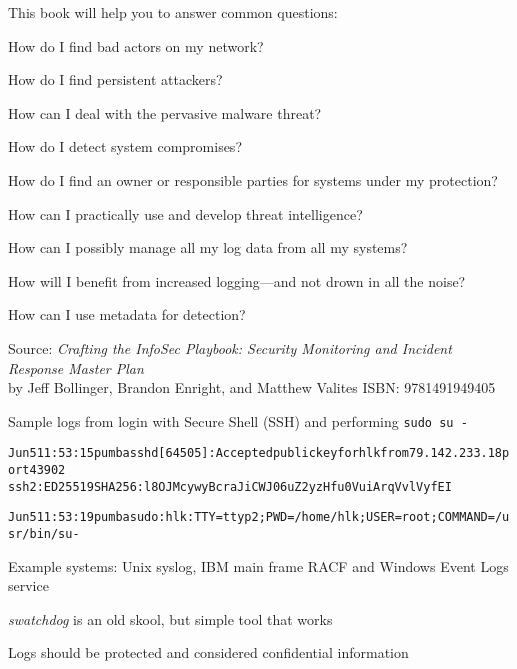 \documentclass[Screen16to9,17pt]{foils}
\begin{document}


This book will help you to answer common questions:
\begin{list2}
\item How do I find bad actors on my network?
\item How do I find persistent attackers?
\item How can I deal with the pervasive malware threat?
\item How do I detect system compromises?
\item How do I find an owner or responsible parties for systems under my protection?
\item How can I practically use and develop threat intelligence?
\item How can I possibly manage all my log data from all my systems?
\item How will I benefit from increased logging—and not drown in all the noise?
\item How can I use metadata for detection?
\end{list2}
Source: \emph{Crafting the InfoSec Playbook: Security Monitoring and Incident Response Master Plan}\\
 by Jeff Bollinger, Brandon Enright, and Matthew Valites ISBN: 9781491949405





Sample logs from login with Secure Shell (SSH) and performing \verb+sudo su -+
\begin{alltt}\footnotesize
Jun  5 11:53:15 pumba sshd[64505]: Accepted publickey for hlk from 79.142.233.18 port 43902
 ssh2: ED25519 SHA256:l8OJMcywyBcraJiCWJ06uZ2yzHfu0VuiArqVvlVyfEI

Jun  5 11:53:19 pumba sudo:      hlk : TTY=ttyp2 ; PWD=/home/hlk ; USER=root ; COMMAND=/usr/bin/su -
\end{alltt}

\begin{list1}
\item Example systems: Unix syslog, IBM main frame RACF and Windows Event Logs service
\item \emph{swatchdog} is an old skool, but simple tool that works
\item Logs should be protected and considered confidential information
\end{list1}



\end{document}
